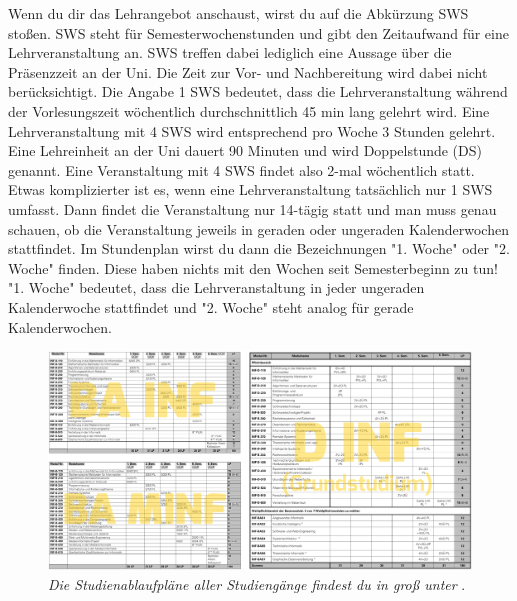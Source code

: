 Wenn du dir das Lehrangebot anschaust, wirst du auf die Abkürzung SWS stoßen. SWS steht für Semesterwochenstunden und gibt den Zeitaufwand für eine Lehrveranstaltung an.
SWS treffen dabei lediglich eine Aussage über die Präsenzzeit an der Uni. Die Zeit zur Vor- und Nachbereitung wird dabei nicht berücksichtigt.
Die Angabe 1 SWS bedeutet, dass die Lehrveranstaltung während der Vorlesungszeit wöchentlich durchschnittlich 45 min lang gelehrt wird. Eine Lehrveranstaltung mit 4 SWS wird entsprechend
pro Woche 3 Stunden gelehrt. Eine Lehreinheit an der Uni dauert 90 Minuten und wird Doppelstunde (DS) genannt. Eine Veranstaltung mit 4 SWS findet also 2-mal wöchentlich statt.
Etwas komplizierter ist es, wenn eine Lehrveranstaltung tatsächlich nur 1 SWS umfasst. Dann findet die Veranstaltung nur 14-tägig statt und man muss genau schauen, ob die Veranstaltung jeweils in
geraden oder ungeraden Kalenderwochen stattfindet. Im Stundenplan wirst du dann die Bezeichnungen "1. Woche" oder "2. Woche" finden. Diese haben nichts mit den Wochen seit Semesterbeginn zu tun!
"1. Woche" bedeutet, dass die Lehrveranstaltung in jeder ungeraden Kalenderwoche stattfindet und "2. Woche" steht analog für gerade Kalenderwochen.

\begin{figure}
	\includegraphics[width=\textwidth]{img/alle_studienablaufplaene.pdf}
	\caption*{\small \textit{Die Studienablaufpläne aller Studiengänge findest du in groß unter} .}
\end{figure}



